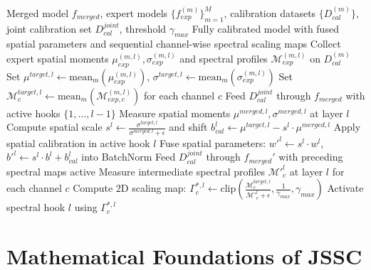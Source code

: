 \documentclass{article}
\begin{document}
\begin{algorithm}[tb]
\caption{Sequential Joint Spatial-Spectral Calibration (JSSC)}
\label{alg:jssc}
\begin{algorithmic}[1]
\REQUIRE Merged model $f_{merged}$, expert models $\{f_{exp}^{(m)}\}_{m=1}^M$, calibration datasets $\{D_{cal}^{(m)}\}$, joint calibration set $D_{cal}^{joint}$, threshold $\gamma_{max}$
\ENSURE Fully calibrated model with fused spatial parameters and sequential channel-wise spectral scaling maps
    \STATE Collect expert spatial moments $\mu_{exp}^{(m, l)}, \sigma_{exp}^{(m, l)}$ and spectral profiles $\mathcal{M}_{exp}^{(m, l)}$ on $D_{cal}^{(m)}$
    \STATE Set $\mu^{target, l} \leftarrow \text{mean}_m(\mu_{exp}^{(m, l)})$, $\sigma^{target, l} \leftarrow \text{mean}_m(\sigma_{exp}^{(m, l)})$
    \STATE Set $\mathcal{M}^{target, l}_c \leftarrow \text{mean}_m(\mathcal{M}_{exp, c}^{(m, l)})$ for each channel $c$
\ENDFOR
{}
    \STATE Feed $D_{cal}^{joint}$ through $f_{merged}$ with active hooks $\{1, \dots, l-1\}$
    \STATE Measure spatial moments $\mu^{merged, l}, \sigma^{merged, l}$ at layer $l$
    \STATE Compute spatial scale $s^l \leftarrow \frac{\sigma^{target, l}}{\sigma^{merged, l} + \epsilon}$ and shift $b_{cal}^l \leftarrow \mu^{target, l} - s^l \cdot \mu^{merged, l}$
    \STATE Apply spatial calibration in active hook $l$
    \STATE Fuse spatial parameters: $w'^l \leftarrow s^l \cdot w^l$, $b'^l \leftarrow s^l \cdot b^l + b_{cal}^l$ into BatchNorm
\ENDFOR
{}
    \STATE Feed $D_{cal}^{joint}$ through $f_{merged}'$ with preceding spectral maps active
    \STATE Measure intermediate spectral profiles $\mathcal{M}'^l_c$ at layer $l$ for each channel $c$
    \STATE Compute 2D scaling map: $\Gamma_c^{*, l} \leftarrow \text{clip}\left( \frac{\mathcal{M}^{target, l}_c}{\mathcal{M}'^l_c + \epsilon}, \frac{1}{\gamma_{max}}, \gamma_{max} \right)$
    \STATE Activate spectral hook $l$ using $\Gamma_c^{*, l}$
\ENDFOR
\end{algorithmic}
\end{algorithm}

\section{Mathematical Foundations of JSSC}
\label{sec:method}
\end{document}
